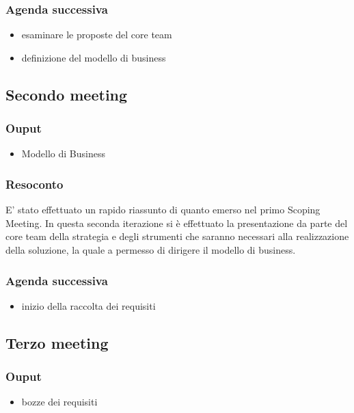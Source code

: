 \subsubsection*{Agenda successiva}
\begin{itemize}
    \item esaminare le proposte del core team
    \item definizione del modello di business
\end{itemize} 



\subsection*{Secondo meeting}
\subsubsection*{Ouput}
\begin{itemize}
    \item Modello di Business
\end{itemize} 
\subsubsection*{Resoconto}
E' stato effettuato un rapido riassunto di quanto emerso nel primo Scoping Meeting. In questa seconda iterazione 
si è effettuato la presentazione da parte del core team della strategia e degli strumenti che saranno necessari 
alla realizzazione della soluzione, la quale a permesso di dirigere il modello di business.
\subsubsection*{Agenda successiva}
\begin{itemize}
    \item inizio della raccolta dei requisiti
\end{itemize} 



\subsection*{Terzo meeting}
\subsubsection*{Ouput}
\begin{itemize}
    \item bozze dei requisiti
\end{itemize} 
